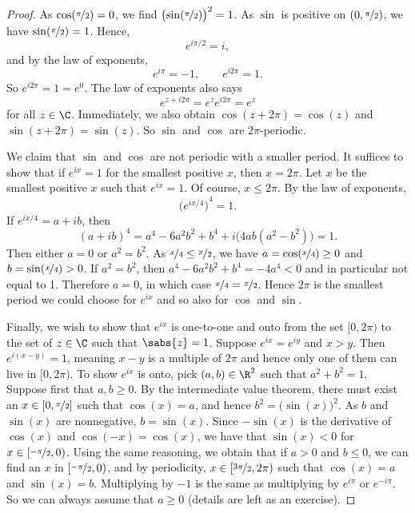 \begin{proof}
As $\cos(\nicefrac{\pi}{2}) = 0$, we find
${\bigl(\sin(\nicefrac{\pi}{2})\bigr)}^2 = 1$.
As $\sin$ is positive on $(0,\nicefrac{\pi}{2})$, we have
$\sin(\nicefrac{\pi}{2}) = 1$.
Hence,
\begin{equation*}
e^{i \pi /2} = i ,
\end{equation*}
and by the law of exponents,
\begin{equation*}
e^{i \pi} = -1 ,
\qquad 
e^{i 2\pi} = 1 .
\end{equation*}
So $e^{i2\pi} = 1 = e^0$.  The law of exponents also says
\begin{equation*}
e^{z+i2\pi} = e^z e^{i2\pi} = e^z
\end{equation*}
for all $z \in \C$.  Immediately, we also obtain
$\cos(z+2\pi) = \cos(z)$ and $\sin(z+2\pi) = \sin(z)$.
So $\sin$ and $\cos$ are $2\pi$-periodic.

We claim that $\sin$ and $\cos$ are not periodic with a smaller period.  It
suffices to show that if $e^{ix} = 1$ for the
smallest positive $x$, then
$x = 2\pi$.  Let $x$ be the smallest positive $x$ such that
$e^{ix} = 1$.
Of course, $x \leq 2\pi$.
By the law of exponents,
\begin{equation*}
{\bigl(e^{ix/4}\bigr)}^4 = 1 .
\end{equation*}
If $e^{ix/4} = a+ib$, then
\begin{equation*}
{(a+ib)}^4
=a^4-6a^2b^2+b^4 + i\bigl(4ab(a^2-b^2)\bigr)
=1 .
\end{equation*}
Then either $a = 0$ or $a^2 = b^2$.
As $\nicefrac{x}{4} \leq \nicefrac{\pi}{2}$, we have $a = \cos(\nicefrac{x}{4}) \geq 0$ and
$b = \sin(\nicefrac{x}{4}) > 0$.
If $a^2=b^2$, then
$a^4-6a^2b^2+b^4 = -4a^4 < 0$ and in particular not equal to 1.
Therefore $a=0$, in which case $\nicefrac{x}{4} = \nicefrac{\pi}{2}$.
Hence $2\pi$ is the smallest period we could choose for $e^{ix}$
and so also for $\cos$ and $\sin$.

Finally, we wish to show that $e^{ix}$ is one-to-one and onto
from the set $[0,2\pi)$ to the set of $z \in \C$ such that
$\sabs{z} = 1$.  Suppose $e^{ix} = e^{iy}$ and 
$x > y$.  Then
$e^{i(x-y)} = 1$, meaning $x-y$ is a multiple of $2\pi$ and hence
only one of them can live in $[0,2\pi)$.
To show $e^{ix}$ is onto, pick $(a,b) \in \R^2$ such that $a^2+b^2 = 1$.
Suppose first that $a,b \geq 0$.  By the intermediate value theorem,
there must exist an $x \in [0,\nicefrac{\pi}{2}]$ such that
$\cos(x) = a$, and hence $b^2 = \bigl(\sin(x)\bigr)^2$.  As
$b$ and $\sin(x)$ are nonnegative, $b = \sin(x)$.
Since $-\sin(x)$ is the derivative of $\cos(x)$
and $\cos(-x) = \cos(x)$,
we have that $\sin(x) < 0$ for $x \in [\nicefrac{-\pi}{2},0)$.
Using the same reasoning, we obtain that
if $a > 0$ and $b \leq 0$, we can find an $x$ in $[\nicefrac{-\pi}{2},0)$,
and by periodicity,
$x \in [\nicefrac{3\pi}{2},2\pi)$ such that $\cos(x) = a$ and $\sin(x)=b$.
Multiplying by $-1$ is the same as multiplying by $e^{i\pi}$ or
$e^{-i\pi}$.  So we can always assume that $a \geq 0$ (details are left
as an exercise).
\end{proof}

